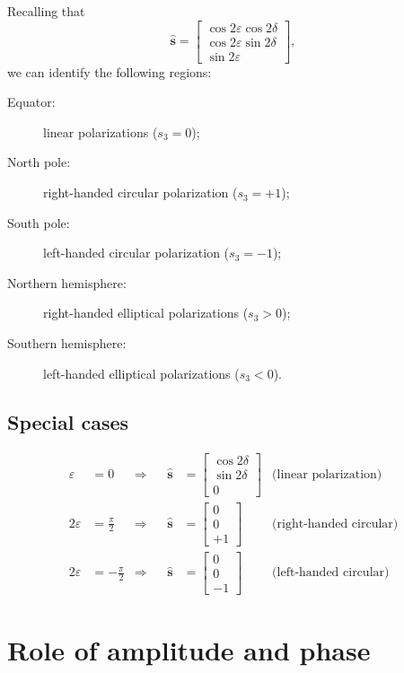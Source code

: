 Recalling that
\[
\hat{\mathbf{s}} =
\begin{bmatrix}
    \cos 2\varepsilon \cos 2\delta\\
    \cos 2\varepsilon \sin 2\delta\\
    \sin 2\varepsilon
\end{bmatrix},
\]
we can identify the following regions:
\begin{description}
    \item[Equator:] linear polarizations ($s_3 = 0$);
    \item[North pole:] right-handed circular polarization ($s_3 = +1$);
    \item[South pole:] left-handed circular polarization ($s_3 = -1$);
    \item[Northern hemisphere:] right-handed elliptical polarizations ($s_3 > 0$);
    \item[Southern hemisphere:] left-handed elliptical polarizations ($s_3 < 0$).
\end{description}

\subsection*{Special cases}
\begin{align}
    \varepsilon &= 0
    &\Rightarrow&
    &\hat{\mathbf{s}} &= 
    \begin{bmatrix}\cos 2\delta\\ \sin 2\delta\\ 0\end{bmatrix} 
    &\text{(linear polarization)}\\[6pt]
    2\varepsilon &= \frac{\pi}{2}
    &\Rightarrow&
    &\hat{\mathbf{s}} &= 
    \begin{bmatrix}0\\ 0\\ +1\end{bmatrix}
    &\text{(right-handed circular)}\\[6pt]
    2\varepsilon &= -\frac{\pi}{2}
    &\Rightarrow&
    &\hat{\mathbf{s}} &= 
    \begin{bmatrix}0\\ 0\\ -1\end{bmatrix}
    &\text{(left-handed circular)}
\end{align}

\section{Role of amplitude and phase}

